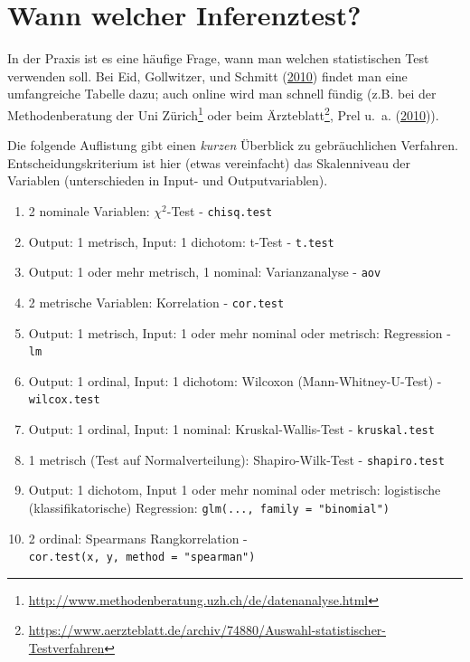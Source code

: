 \documentclass[12pt,ngerman,]{book}
\providecommand{\tightlist}{%
  \setlength{\itemsep}{0pt}\setlength{\parskip}{0pt}}
\let\rmarkdownfootnote\footnote%
\def\footnote{\protect\rmarkdownfootnote}
\renewcommand{\href}[2]{#2\footnote{\url{#1}}}
\theoremstyle{definition}
\theoremstyle{definition}
\theoremstyle{remark}
\begin{document}
\section{Wann welcher Inferenztest?}\label{wannwelcher}

In der Praxis ist es eine häufige Frage, wann man welchen statistischen
Test verwenden soll. Bei Eid, Gollwitzer, und Schmitt
(\protect\hyperlink{ref-eid2010statistik}{2010}) findet man eine
umfangreiche Tabelle dazu; auch online wird man schnell fündig (z.B. bei
der
\href{http://www.methodenberatung.uzh.ch/de/datenanalyse.html}{Methodenberatung
der Uni Zürich} oder beim
\href{https://www.aerzteblatt.de/archiv/74880/Auswahl-statistischer-Testverfahren}{Ärzteblatt},
Prel u.~a. (\protect\hyperlink{ref-welchertest}{2010})).

Die folgende Auflistung gibt einen \emph{kurzen} Überblick zu
gebräuchlichen Verfahren. Entscheidungskriterium ist hier (etwas
vereinfacht) das Skalenniveau der Variablen (unterschieden in Input- und
Outputvariablen).

\begin{enumerate}
\def\labelenumi{\arabic{enumi}.}
\tightlist
\item
  2 nominale Variablen: \(\chi^2\)-Test - \texttt{chisq.test}
\item
  Output: 1 metrisch, Input: 1 dichotom: t-Test - \texttt{t.test}
\item
  Output: 1 oder mehr metrisch, 1 nominal: Varianzanalyse - \texttt{aov}
\item
  2 metrische Variablen: Korrelation - \texttt{cor.test}
\item
  Output: 1 metrisch, Input: 1 oder mehr nominal oder metrisch:
  Regression - \texttt{lm}
\item
  Output: 1 ordinal, Input: 1 dichotom: Wilcoxon (Mann-Whitney-U-Test) -
  \texttt{wilcox.test}
\item
  Output: 1 ordinal, Input: 1 nominal: Kruskal-Wallis-Test -
  \texttt{kruskal.test}
\item
  1 metrisch (Test auf Normalverteilung): Shapiro-Wilk-Test -
  \texttt{shapiro.test}
\item
  Output: 1 dichotom, Input 1 oder mehr nominal oder metrisch:
  logistische (klassifikatorische) Regression:
  \texttt{glm(...,\ family\ =\ "binomial")}
\item
  2 ordinal: Spearmans Rangkorrelation -
  \texttt{cor.test(x,\ y,\ method\ =\ "spearman")}
\end{enumerate}
\end{document}
